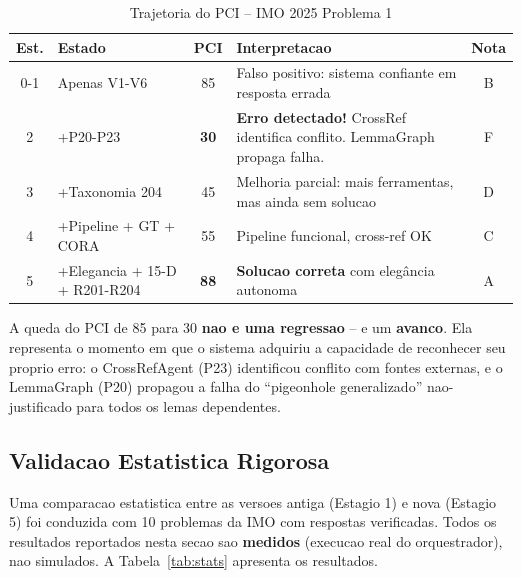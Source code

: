 \documentclass[5p]{elsarticle}
\begin{document}
\begin{table}[H]
 \centering
 \caption{Trajetoria do PCI -- IMO 2025 Problema 1}
 \label{tab:pcitraj}
 \footnotesize
 \begin{tabular}{clcp{4.5cm}c}
 \toprule
 \textbf{Est.} & \textbf{Estado} & \textbf{PCI} & \textbf{Interpretacao} & \textbf{Nota}\\
 \midrule
 0-1 & Apenas V1-V6 & 85 & Falso positivo: sistema confiante em resposta errada & B\\
 \rowcolor{redbg}
 2 & +P20-P23 & \textbf{30} & \textbf{Erro detectado!} CrossRef identifica conflito. LemmaGraph propaga falha. & F\\
 3 & +Taxonomia 204 & 45 & Melhoria parcial: mais ferramentas, mas ainda sem solucao & D\\
 4 & +Pipeline + GT + CORA & 55 & Pipeline funcional, cross-ref OK & C\\
 \rowcolor{greenbg}
 5 & +Elegancia + 15-D + R201-R204 & \textbf{88} & \textbf{Solucao correta} com elegância autonoma & A\\
 \bottomrule
 \end{tabular}
\end{table}

A queda do PCI de 85 para 30 \textbf{nao e uma regressao} -- e um \textbf{avanco}.
Ela representa o momento em que o sistema adquiriu a capacidade de reconhecer
seu proprio erro: o CrossRefAgent (P23) identificou conflito com fontes externas,
e o LemmaGraph (P20) propagou a falha do ``pigeonhole generalizado'' nao-justificado
para todos os lemas dependentes.

\subsection{Validacao Estatistica Rigorosa}

Uma comparacao estatistica entre as versoes antiga (Estagio 1) e nova (Estagio 5)
foi conduzida com 10 problemas da IMO com respostas verificadas. Todos os
resultados reportados nesta secao sao \textbf{medidos} (execucao real do
orquestrador), nao simulados. A Tabela~\ref{tab:stats} apresenta os resultados.
\end{document}
